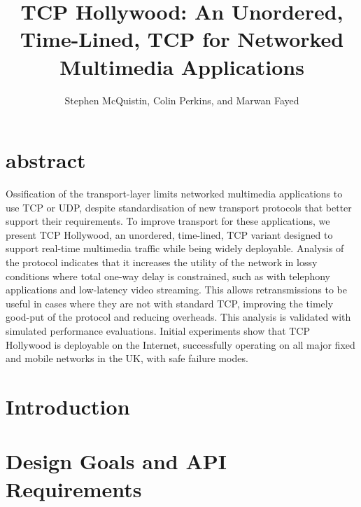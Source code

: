 \documentclass[10pt,journal]{IEEEtran}
\begin{document}
\title{TCP Hollywood: An Unordered, Time-Lined, TCP for Networked Multimedia Applications}
\author{
  Stephen McQuistin,
  Colin Perkins, and
  Marwan Fayed
}

\lstset{
  basicstyle=\scriptsize\ttfamily,
  language=c,
  breaklines=true,
}

\maketitle
\section*{abstract}

Ossification of the transport-layer limits networked multimedia
applications to use TCP or UDP, despite standardisation of new transport
protocols that better support their requirements.  To improve transport for
these applications, we present TCP Hollywood, an unordered, time-lined, TCP
variant designed to support real-time multimedia traffic while being widely
deployable. Analysis of the protocol indicates that it increases the
utility of the network in lossy conditions where total one-way delay
is constrained, such as with telephony applications and low-latency video
streaming. This allows retransmissions to be useful in cases where they
are not with standard TCP, improving the timely good-put of the protocol
and reducing overheads. This analysis is validated with simulated performance
evaluations.
Initial experiments show that TCP Hollywood is deployable on the Internet,
successfully operating on all major fixed and mobile
networks in the UK, with safe failure modes.

\section{Introduction}
\label{sec:introduction}



\section{Design Goals and API Requirements}
\label{sec:background} 
\end{document}
